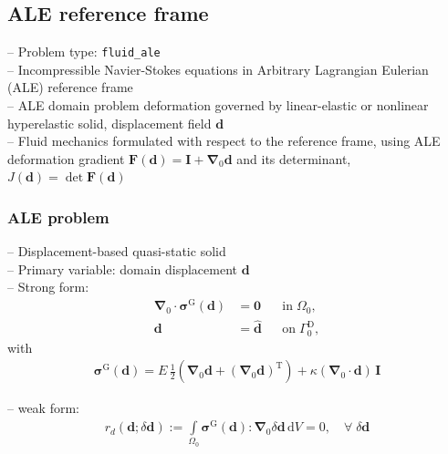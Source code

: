 \documentclass[a4paper,12pt]{report}
\newcommand{\bs}[1]{\boldsymbol{#1}}
\newcommand{\Om}{\mathit{\Omega}}
\newcommand{\Gm}{\mathit{\Gamma}}
\begin{document}
\subsection{ALE reference frame}

-- Problem type: \verb.fluid_ale.\\

-- Incompressible Navier-Stokes equations in Arbitrary Lagrangian Eulerian (ALE) reference frame\\

-- ALE domain problem deformation governed by linear-elastic or nonlinear hyperelastic solid, displacement field $\bs{d}$\\

-- Fluid mechanics formulated with respect to the reference frame, using ALE deformation gradient $\bs{F}(\bs{d}) = \bs{I} + \bs{\nabla}_0\bs{d}$ and its determinant, $J(\bs{d})=\det \bs{F}(\bs{d})$\\

\subsubsection{ALE problem}

-- Displacement-based quasi-static solid\\

-- Primary variable: domain displacement $\bs{d}$\\

-- Strong form:
\begin{align}
\bs{\nabla}_{0} \cdot \bs{\sigma}^{\mathrm{G}}(\bs{d}) &= \bs{0} &&\text{in} \; \mathit{\Om}_0, \label{eq:divsigma_ale} \\
\bs{d} &= \hat{\bs{d}} &&\text{on} \; \mathit{\Gm}_0^{\mathrm{D}}, \label{eq:dbc_ale}
\end{align}
with
\begin{align}
\bs{\sigma}^{\mathrm{G}}(\bs{d}) = E \,\frac{1}{2}\left(\bs{\nabla}_0\bs{d} + (\bs{\nabla}_0\bs{d})^{\mathrm{T}}\right) + \kappa \left(\bs{\nabla}_0 \cdot \bs{d}\right)\,\bs{I}
\end{align}

-- weak form:
\begin{align}
r_{d}(\bs{d};\delta\bs{d}) := \int\limits_{\Om_0}\bs{\sigma}^{\mathrm{G}}(\bs{d}) : \bs{\nabla}_{0}\delta\bs{d}\,\mathrm{d}V = 0, \quad \forall \; \delta\bs{d} \label{eq:r_d}
\end{align}
\end{document}
